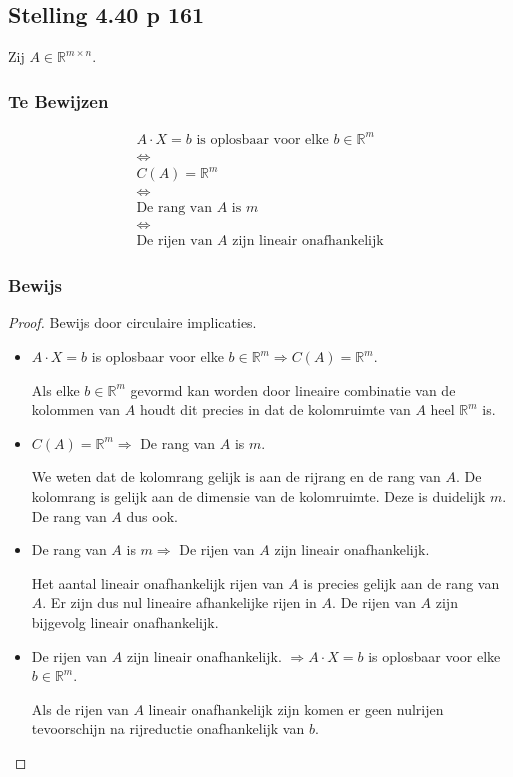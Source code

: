 \documentclass[lineaire_algebra_oplossingen.tex]{subfiles}
\begin{document}
\subsection{Stelling 4.40 p 161}
\label{4.40}
Zij $A \in \mathbb{R}^{m\times n}$.

\subsubsection*{Te Bewijzen}
\begin{gather*}
A\cdot X = b \text{ is oplosbaar voor elke } b\in \mathbb{R}^m \\
\Leftrightarrow \\
C(A) = \mathbb{R}^m \\
\Leftrightarrow \\
\text{De rang van $A$ is $m$} \\
\Leftrightarrow \\
\text{De rijen van $A$ zijn lineair onafhankelijk}
\end{gather*}

\subsubsection*{Bewijs}
\begin{proof}
Bewijs door circulaire implicaties.
\begin{itemize}
\item
$A\cdot X = b$ is oplosbaar voor elke $b\in \mathbb{R}^m \Rightarrow C(A) = \mathbb{R}^m$.

Als elke $b\in \mathbb{R}^m$ gevormd kan worden door lineaire combinatie van de kolommen van $A$ houdt dit precies in dat de kolomruimte van $A$ heel $\mathbb{R}^m$ is.

\item
$C(A) = \mathbb{R}^m \Rightarrow $ De rang van $A$ is $m$.

We weten dat de kolomrang gelijk is aan de rijrang en de rang van $A$. De kolomrang is gelijk aan de dimensie van de kolomruimte. Deze is duidelijk $m$. De rang van $A$ dus ook.

\item
De rang van $A$ is $m \Rightarrow$ De rijen van $A$ zijn lineair onafhankelijk.
 
Het aantal lineair onafhankelijk rijen van $A$ is precies gelijk aan de rang van $A$. Er zijn dus nul lineaire afhankelijke rijen in $A$. De rijen van $A$ zijn bijgevolg lineair onafhankelijk.

\item
De rijen van $A$ zijn lineair onafhankelijk. $\Rightarrow A\cdot X = b$ is oplosbaar voor elke $b\in \mathbb{R}^m$.

Als de rijen van $A$ lineair onafhankelijk zijn komen er geen nulrijen tevoorschijn na rijreductie onafhankelijk van $b$.
\end{itemize}
\end{proof}
\end{document}
